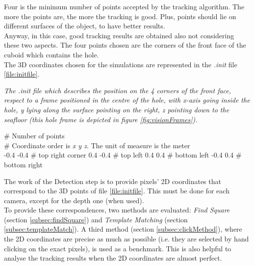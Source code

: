 Four is the minimum number of points accepted by the tracking algorithm. The more the points are, the more the tracking is good. Plus, points should lie on different surfaces of the object, to have better results. \\
Anyway, in this case, good tracking results are obtained also not considering these two aspects. The four points chosen are the corners of the front face of the cuboid which contains the hole.\\
The 3D coordinates chosen for the simulations are represented in the \textit{.init} file \ref{file:initfile}.
\begin{fileAlgorithm}
	\caption{\textit{The \emph{.init} file which describes the position on the 4 corners of the front face, respect to a frame positioned in the centre of the hole, with x-axis going inside the hole, y lying along the surface pointing on the right, z pointing down to the seafloor (this hole frame is depicted in figure \ref{fig:visionFrames}).}}
	\label{file:initfile}
	\begin{algorithmic}[1]
	         \hspace*{50px}    \# Number of points\\
	          \hspace*{59px}        \# Coordinate order is \textit{x y z}. The unit of measure is the meter\\
	      -0.4     -0.4  \hspace*{5px} \# top right corner
	      0.4      -0.4  \hspace*{8px}   \# top left
	      0.4     0.4   \hspace*{11px} \# bottom left
	      -0.4    0.4    \hspace*{7px} \# bottom right
	\end{algorithmic}
\end{fileAlgorithm}
\vspace{30px}

\noindent The work of the Detection step is to provide pixels' 2D coordinates that correspond to the 3D points of file \ref{file:initfile}. This must be done for each camera, except for the depth one (when used).\\
To provide these correspondences, two methods are evaluated: \textit{Find Square} (section \ref{subsec:findSquare}) and \textit{Template Matching} (section \ref{subsec:templateMatch}). A third method (section \ref{subsec:clickMethod}), where the 2D coordinates are precise as much as possible (i.e. they are selected by hand clicking on the exact pixels), is used as a benchmark. This is also helpful to analyse the tracking results when the 2D coordinates are almost perfect.\\

